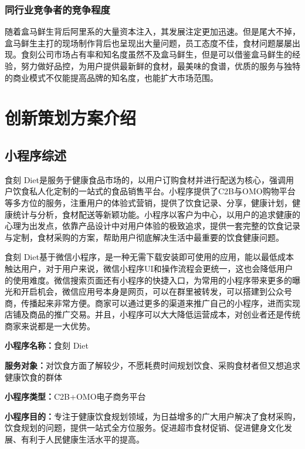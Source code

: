 \documentclass[UTF8,12pt]{ctexart}
\numberwithin{figure}{section}%
\begin{document}
\begin{spacing}{2}
\subsubsection{同行业竞争者的竞争程度}

随着盒马鲜生背后阿里系的大量资本注入，其发展注定更加迅速。但是尾大不掉，盒马鲜生主打的现场制作背后也呈现出大量问题，员工态度不佳，食材问题屡屡出现。食刻公司市场占有率和知名度虽然不及盒马鲜生，但是可以借鉴盒马鲜生的经验，努力做好品控，为用户提供最新鲜的食材，最美味的食谱，优质的服务与独特的商业模式不仅能提高品牌的知名度，也能扩大市场范围。


\newpage
\section{创新策划方案介绍}
\subsection{小程序综述}
食刻 Diet是服务于健康食品市场的，以用户订购食材并进行配送为核心，强调用户饮食私人化定制的一站式的食品销售平台。小程序提供了C2B与OMO购物平台等多方位的服务，注重用户的体验式营销，提供了饮食记录、分享，健康计划，健康统计与分析，食材配送等新颖功能。小程序以客户为中心，以用户的追求健康的心理为出发点，依靠产品设计中对用户体验的极致追求，提供一套完整的饮食记录与定制，食材采购的方案，帮助用户彻底解决生活中最重要的饮食健康问题。

食刻 Diet基于微信小程序，是一种无需下载安装即可使用的应用，能以最低成本触达用户，对于用户来说，微信小程序UI和操作流程会更统一，这也会降低用户的使用难度。微信搜索页面还有小程序的快捷入口，为常用的小程序带来更多的曝光和开启机会，微信应用号本身是网页，可以在群里被转发，可以搭建到公众号商，传播起来非常方便。商家可以通过更多的渠道来推广自己的小程序，进而实现店铺及商品的推广交易。并且，小程序可以大大降低运营成本，对创业者还是传统商家来说都是一大优势。

\textbf{小程序名称：}食刻 Diet

\textbf{服务对象：}对饮食方面了解较少，不愿耗费时间规划饮食、采购食材者但又想追求健康饮食的群体

\textbf{小程序类型：}C2B+OMO电子商务平台

\textbf{小程序目的：}专注于健康饮食规划领域，为日益增多的广大用户解决了食材采购，饮食规划的问题，提供一站式全方位服务。促进超市食材促销、促进健身文化发展、有利于人民健康生活水平的提高。


\end{spacing}
\end{document}
